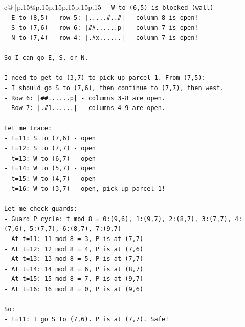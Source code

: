 \documentclass{article}
\begin{document}
{\begin{supertabular}{c@{$\;$}|p{.15\linewidth}@{}p{.15\linewidth}p{.15\linewidth}p{.15\linewidth}p{.15\linewidth}p{.15\linewidth}}
{{{\texttt{{-} W to (6,5) is blocked (wall)} \\
\texttt{{-} E to (8,5) {-} row 5: |.....\#..\#| {-} column 8 is open!} \\
\texttt{{-} S to (7,6) {-} row 6: |\#\#......p| {-} column 7 is open!} \\
\texttt{{-} N to (7,4) {-} row 4: |.\#x......| {-} column 7 is open!} \\
\\ 
\texttt{So I can go E, S, or N.} \\
\\ 
\texttt{I need to get to (3,7) to pick up parcel 1. From (7,5):} \\
\texttt{{-} I should go S to (7,6), then continue to (7,7), then west.} \\
\texttt{{-} Row 6: |\#\#......p| {-} columns 3{-}8 are open.} \\
\texttt{{-} Row 7: |.\#1......| {-} columns 4{-}9 are open.} \\
\\ 
\texttt{Let me trace:} \\
\texttt{{-} t=11: S to (7,6) {-} open} \\
\texttt{{-} t=12: S to (7,7) {-} open} \\
\texttt{{-} t=13: W to (6,7) {-} open} \\
\texttt{{-} t=14: W to (5,7) {-} open} \\
\texttt{{-} t=15: W to (4,7) {-} open} \\
\texttt{{-} t=16: W to (3,7) {-} open, pick up parcel 1!} \\
\\ 
\texttt{Let me check guards:} \\
\texttt{{-} Guard P cycle: t mod 8 = 0:(9,6), 1:(9,7), 2:(8,7), 3:(7,7), 4:(7,6), 5:(7,7), 6:(8,7), 7:(9,7)} \\
\texttt{{-} At t=11: 11 mod 8 = 3, P is at (7,7)} \\
\texttt{{-} At t=12: 12 mod 8 = 4, P is at (7,6)} \\
\texttt{{-} At t=13: 13 mod 8 = 5, P is at (7,7)} \\
\texttt{{-} At t=14: 14 mod 8 = 6, P is at (8,7)} \\
\texttt{{-} At t=15: 15 mod 8 = 7, P is at (9,7)} \\
\texttt{{-} At t=16: 16 mod 8 = 0, P is at (9,6)} \\
\\ 
\texttt{So:} \\
\texttt{{-} t=11: I go S to (7,6). P is at (7,7). Safe!} \\
}}}
\end{supertabular}}
\end{document}
